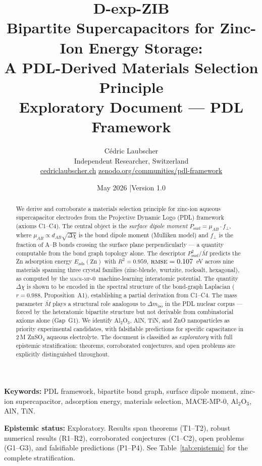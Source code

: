 \documentclass[11pt,a4paper]{article}
\title{\textbf{D-exp-ZIB}\\[0.5em]
\large Bipartite Supercapacitors for Zinc-Ion Energy Storage:\\
A PDL-Derived Materials Selection Principle\\[0.5em]
\normalsize Exploratory Document — PDL Framework}
\author{Cédric Laubscher\\
\small Independent Researcher, Switzerland\\
\small \href{https://cedriclaubscher.ch}{cedriclaubscher.ch} \quad
\href{https://zenodo.org/communities/pdl-framework}{zenodo.org/communities/pdl-framework}}
\date{May 2026 \quad|\quad Version 1.0}
\newcommand{\Eads}{E_{\mathrm{ads}}}
\newcommand{\Psurf}{P_{\mathrm{surf}}}
\newcommand{\Mmoy}{\bar{M}}
\newcommand{\DeltaEN}{\Delta\chi}
\newcommand{\muAB}{\mu_{AB}}
\newcommand{\fracZ}{f_{\perp}}
\newcommand{\MACE}{\textsc{mace-mp-0}}
\newcommand{\RMS}{\textsc{rmse}}
\begin{document}
\maketitle

\begin{abstract}
We derive and corroborate a materials selection principle for zinc-ion aqueous supercapacitor electrodes from the Projective Dynamic Logo (PDL) framework (axioms C1--C4). The central object is the \emph{surface dipole moment} $\Psurf = \muAB \cdot \fracZ$, where $\muAB \propto d_{AB}\sqrt{\DeltaEN}$ is the bond dipole moment (Mulliken model) and $\fracZ$ is the fraction of A--B bonds crossing the surface plane perpendicularly — a quantity computable from the bond graph topology alone. The descriptor $\Psurf^2/\Mmoy$ predicts the Zn adsorption energy $\Eads(\mathrm{Zn})$ with $R^2 = 0.959$, $\RMS = 0.107$~eV across nine materials spanning three crystal families (zinc-blende, wurtzite, rocksalt, hexagonal), as computed by the \MACE\ machine-learning interatomic potential. The quantity $\DeltaEN$ is shown to be encoded in the spectral structure of the bond-graph Laplacian ($r = 0.988$, Proposition~A1), establishing a partial derivation from C1--C4. The mass parameter $\Mmoy$ plays a structural role analogous to $\Delta m_{\mathrm{iso}}$ in the PDL nuclear corpus — forced by the heteratomic bipartite structure but not derivable from combinatorial axioms alone (Gap~G1). We identify Al$_2$O$_3$, AlN, TiN, and ZnO nanoparticles as priority experimental candidates, with falsifiable predictions for specific capacitance in 2\,M ZnSO$_4$ aqueous electrolyte. The document is classified as \emph{exploratory} with full epistemic stratification: theorems, corroborated conjectures, and open problems are explicitly distinguished throughout.
\end{abstract}

\clearpage
\tableofcontents
\newpage

\medskip
\noindent\textbf{Keywords:} PDL framework, bipartite bond graph, surface dipole moment, zinc-ion supercapacitor, adsorption energy, materials selection, MACE-MP-0, Al$_2$O$_3$, AlN, TiN.

\medskip
\noindent\textbf{Epistemic status:} Exploratory. Results span theorems (T1--T2), robust numerical results (R1--R2), corroborated conjectures (C1--C2), open problems (G1--G3), and falsifiable predictions (P1--P4). See Table~\ref{tab:epistemic} for the complete stratification.
\end{document}
